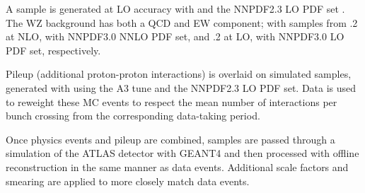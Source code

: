 A \tty sample is generated at \ac{LO} accuracy with \madgraphfiveamc and
the NNPDF2.3 \ac{LO} \ac{PDF} set \cite{NNPDF2dot3}.
The WZ background has both a \ac{QCD} and \ac{EW} component; with samples from
.2 \cite{sherpa2dot2}
at \ac{NLO}, with NNPDF3.0 \ac{NNLO} \ac{PDF} set, and
.2 \cite{madgraph5amc}
at \ac{LO}, with NNPDF3.0 \ac{LO} \ac{PDF} set, respectively.

Pileup (additional proton-proton interactions) is overlaid on simulated samples,
generated with  using the A3 tune \cite{A3tune}
and the NNPDF2.3 \ac{LO} \ac{PDF} set.
Data is used to reweight these \ac{MC} events to respect the mean number of
interactions per bunch crossing from the corresponding data-taking period.

Once physics events and pileup are combined, samples are passed through a
simulation of the \ac{ATLAS} detector with GEANT4 \cite{ATLASsim1,geant4}
and then processed with offline reconstruction in the same manner as data
events. Additional scale factors and smearing are applied to more closely match
data events.
